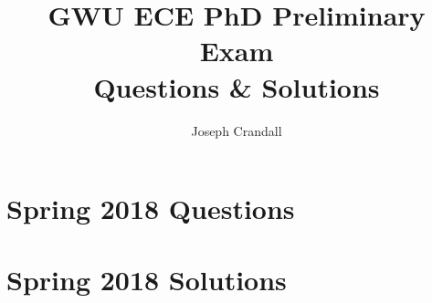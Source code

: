 
\usepackage{algorithm, algpseudocode, chemformula, color, gensymb, siunitx, soul, subfiles}
\usepackage[a4paper]{geometry}

\title{GWU ECE PhD Preliminary Exam\\ Questions \& Solutions}
\author{Joseph Crandall}


\maketitle

\section{Spring 2018 Questions}

\section{Spring 2018 Solutions}










